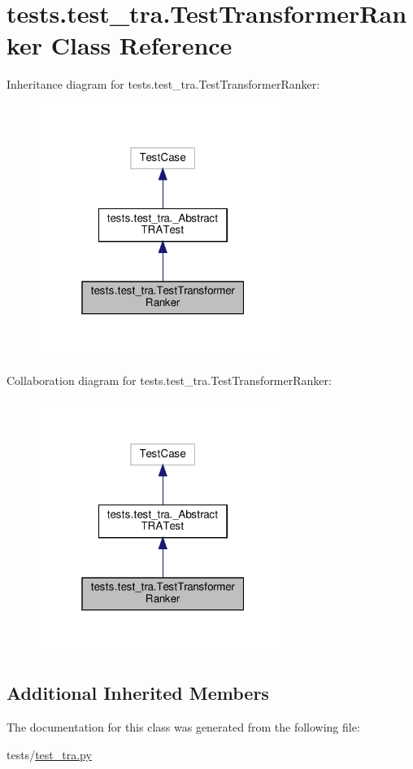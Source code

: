 \hypertarget{classtests_1_1test__tra_1_1TestTransformerRanker}{}\section{tests.\+test\+\_\+tra.\+Test\+Transformer\+Ranker Class Reference}
\label{classtests_1_1test__tra_1_1TestTransformerRanker}


Inheritance diagram for tests.\+test\+\_\+tra.\+Test\+Transformer\+Ranker\+:
\nopagebreak
\begin{figure}[H]
\begin{center}
\leavevmode
\includegraphics[width=229pt]{classtests_1_1test__tra_1_1TestTransformerRanker__inherit__graph}
\end{center}
\end{figure}


Collaboration diagram for tests.\+test\+\_\+tra.\+Test\+Transformer\+Ranker\+:
\nopagebreak
\begin{figure}[H]
\begin{center}
\leavevmode
\includegraphics[width=229pt]{classtests_1_1test__tra_1_1TestTransformerRanker__coll__graph}
\end{center}
\end{figure}
\subsection*{Additional Inherited Members}


The documentation for this class was generated from the following file\+:\begin{DoxyCompactItemize}
\item 
tests/\hyperlink{test__tra_8py}{test\+\_\+tra.\+py}\end{DoxyCompactItemize}
